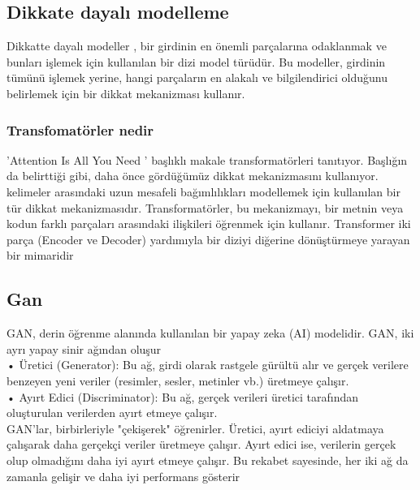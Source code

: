 \documentclass[12pt, a4paper]{article}
\begin{document}
			\subsection{Dikkate dayalı modelleme }	
			Dikkatte dayalı modeller , bir girdinin en önemli parçalarına odaklanmak ve bunları işlemek için kullanılan bir dizi model türüdür. Bu modeller, girdinin tümünü işlemek yerine, hangi parçaların en alakalı ve bilgilendirici olduğunu belirlemek için bir dikkat mekanizması kullanır.\cite{Dikkate-dayalı-modelleme}	
			\subsubsection{Transfomatörler  nedir}	
			'Attention Is All You Need ' başlıklı makale transformatörleri tanıtıyor. Başlığın da belirttiği gibi, daha önce gördüğümüz dikkat mekanizmasını kullanıyor.\cite{transformator2} kelimeler arasındaki uzun mesafeli bağımlılıkları modellemek için kullanılan bir tür dikkat mekanizmasıdır. Transformatörler, bu mekanizmayı, bir metnin veya kodun farklı parçaları arasındaki ilişkileri öğrenmek için kullanır. Transformer  iki parça (Encoder ve Decoder) yardımıyla bir diziyi diğerine dönüştürmeye yarayan bir mimaridir\cite{transformator1}\\
			
			\subsection{Gan}		
			GAN, derin öğrenme alanında kullanılan bir yapay zeka (AI) modelidir. GAN, iki ayrı yapay sinir ağından oluşur \\
			•	Üretici (Generator): Bu ağ, girdi olarak rastgele gürültü alır ve gerçek verilere benzeyen yeni veriler (resimler, sesler, metinler vb.) üretmeye çalışır.\\
			•	Ayırt Edici (Discriminator): Bu ağ, gerçek verileri üretici tarafından oluşturulan verilerden ayırt etmeye çalışır.\\
			GAN'lar, birbirleriyle "çekişerek" öğrenirler. Üretici, ayırt ediciyi aldatmaya çalışarak daha gerçekçi veriler üretmeye çalışır. Ayırt edici ise, verilerin gerçek olup olmadığını daha iyi ayırt etmeye çalışır. Bu rekabet sayesinde, her iki ağ da zamanla gelişir ve daha iyi performans gösterir\cite{Gan-nedir}\\
			
\end{document}
